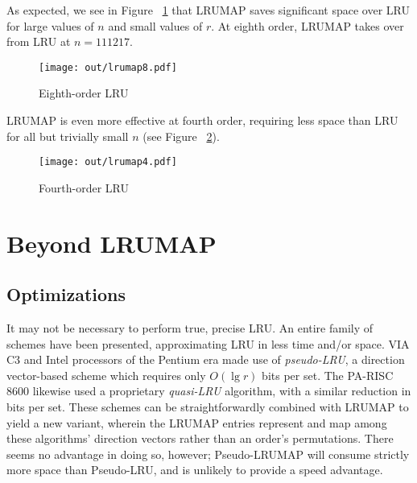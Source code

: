 \documentclass[10pt]{sigplanconf}
\begin{document}
As expected, we see in Figure ~\ref{fig:lru8} that LRUMAP saves significant space over LRU for large
values of $n$ and small values of $r$. At eighth order, LRUMAP takes over
from LRU at $n=111217$.

\begin{figure}
\begin{center}
	\texttt{[image: out/lrumap8.pdf]}
	\caption{Eighth-order LRU}
\label{fig:lru8}
\end{center}
\end{figure}

LRUMAP is even more effective at fourth order, requiring less space than LRU
for all but trivially small $n$ (see Figure ~\ref{fig:lru4}).

\begin{figure}
\begin{center}
	\texttt{[image: out/lrumap4.pdf]}
	\caption{Fourth-order LRU}
\label{fig:lru4}
\end{center}
\end{figure}
\section{Beyond LRUMAP}
\subsection{Optimizations}
It may not be necessary to perform true, precise LRU. An entire family of
schemes have been presented, approximating LRU in less time and/or space.
VIA C3\textsuperscript{\textregistered} and Intel processors of the Pentium\textsuperscript{\textregistered} era\citep{shanley} made use of
\textit{pseudo-LRU}, a direction vector-based scheme which requires only
$O(\lg{r})$ bits per set\citep{handy}. The PA-RISC 8600\citep{hurd} likewise used
a proprietary \textit{quasi-LRU} algorithm, with a similar reduction in bits
per set. These schemes can be straightforwardly combined with LRUMAP to yield a
new variant, wherein the LRUMAP entries represent and map among these
algorithms' direction vectors rather than an order's permutations. There seems
no advantage in doing so, however; Pseudo-LRUMAP will consume strictly more space
than Pseudo-LRU, and is unlikely to provide a speed advantage.
\end{document}
